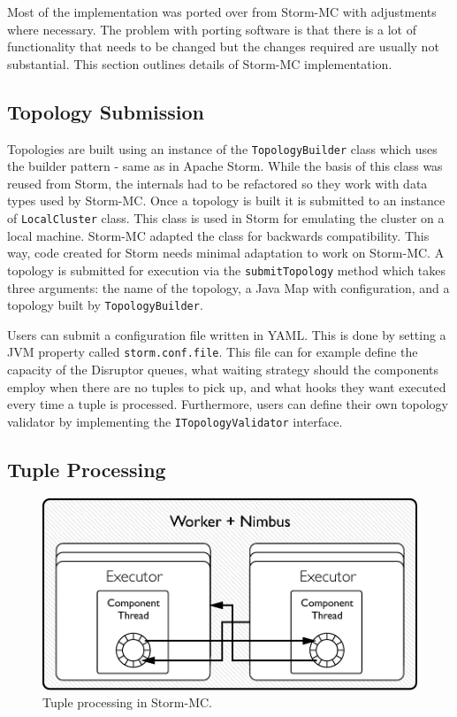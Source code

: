 \documentclass[bsc,logo,frontabs,twoside,singlespacing,normalheadings,parskip]{infthesis}\usepackage[]{graphicx}\usepackage[]{color}
\begin{document}
Most of the implementation was ported over from Storm-MC with adjustments where necessary. The problem with porting software is that there is a lot of functionality that needs to be changed but the changes required are usually not substantial. This section outlines details of Storm-MC implementation.

\subsection{Topology Submission}

Topologies are built using an instance of the \texttt{TopologyBuilder} class which uses the builder pattern - same as in Apache Storm. While the basis  of this class was reused from Storm, the internals had to be refactored so they work with data types used by Storm-MC. Once a topology is built it is submitted to an instance of \texttt{LocalCluster} class. This class is used in Storm for emulating the cluster on a local machine. Storm-MC adapted the class for backwards compatibility. This way, code created for Storm needs minimal adaptation to work on Storm-MC. A topology is submitted for execution via the \texttt{submitTopology} method which takes three arguments: the name of the topology, a Java Map with configuration, and a topology built by \texttt{TopologyBuilder}.

Users can submit a configuration file written in YAML. This is done by setting a JVM property called \texttt{storm.conf.file}. This file can for example define the capacity of the Disruptor queues, what waiting strategy should the components employ when there are no tuples to pick up, and what hooks they want executed every time a tuple is processed. Furthermore, users can define their own topology validator by implementing the \texttt{ITopologyValidator} interface.

\subsection{Tuple Processing}

\begin{figure}[!htb]
	\centering
	\includegraphics[scale=0.7]{pdf/worker_inside_mc.pdf}
	\caption{Tuple processing in Storm-MC.}
	\label{fig:worker_inside_mc}
\end{figure}
\end{document}
